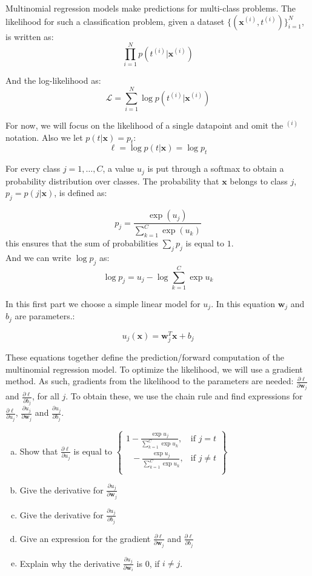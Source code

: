 \documentclass[11pt,a4paper]{article}
\newcommand{\xb}{\mathbf{x}}
\newcommand{\wb}{\mathbf{w}}
\begin{document}
\noindent Multinomial regression models make predictions for multi-class problems. The likelihood for such a classification problem, given a dataset $\{(\xb^{(i)}, t^{(i)})\}_{i=1}^N$, is written as:
\[ \prod_{i=1}^N p(t^{(i)} | \xb^{(i)})\]

\noindent And the log-likelihood as:
\[ \mathcal{L} = \sum_{i=1}^N \log p(t^{(i)} | \xb^{(i)})\]

\noindent For now, we will focus on the likelihood of a single datapoint and omit the $^{(i)}$ notation. Also we let $p(t | \xb) = p_t$:
\[ \ell = \log p(t | \xb) = \log p_t\]


\noindent For every class $j = 1, \ldots, C$, a value $u_j$ is put through a softmax to obtain
a probability distribution over classes. The probability that $\xb$ belongs to class $j$, $p_j = p(j | \xb)$, is defined as:

\[ p_j = \frac{\exp(u_j)}{\sum_{k=1}^C \exp(u_k)} \]
this ensures that the sum of probabilities $\sum_j p_j$ is equal to $1$. \\

And we can write $\log p_j$ as:
\[ \log p_j = u_j - \log {\sum_{k=1}^C \exp u_k} \]

\noindent In this first part we choose a simple linear model for $u_j$. In this equation $\wb_j$ and $b_j$ are parameters.:


\[ u_j(\xb) = \wb_j^T\xb + b_j \] 



\noindent These equations together define the prediction/forward computation of the multinomial regression model. To optimize the likelihood, we will use a gradient method. As such, gradients from the likelihood to the parameters are needed: $\frac{\partial \mathcal{\ell}}{\partial \wb_j}$ and $\frac{\partial \ell}{\partial b_j}$, for all $j$. To obtain these, we use the chain rule and find expressions for $\frac{\partial \mathcal{\ell}}{\partial u_j}$, $\frac{\partial u_j}{\partial \wb_j}$ and $\frac{\partial u_j}{\partial b_j}$.

\begin{enumerate}[(a)]
\item Show that $\frac{\partial \ell}{\partial u_j}$ is equal to $\left.
  \begin{cases}
    1 - \frac{\exp u_j}{\sum_{k=1}^C \exp u_k}, & \text{if } j = t \\
    \text{   }- \frac{\exp u_j}{\sum_{k=1}^C \exp u_k}, & \text{if } j \not= t \\
  \end{cases}
  \right\}$
\item Give the derivative for $\frac{\partial u_j}{\partial \wb_j}$
\item Give the derivative for $\frac{\partial u_j}{\partial b_j}$
\item Give an expression for the gradient $\frac{\partial \ell}{\partial \wb_j}$ and $\frac{\partial \ell}{\partial b_j}$
\item Explain why the derivative $\frac{\partial u_j}{\partial \wb_i}$ is 0, if $i \not= j$.
\end{enumerate}
\end{document}
